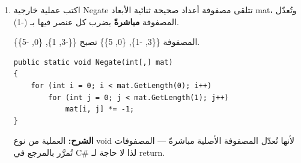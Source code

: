 \documentclass[14pt]{extarticle}
\begin{document}
\begin{enumerate}[itemsep=2em]
\ifwithsols
\begin{boxSolution}
\begin{boxCode}
\begin{english}
\begin{verbatim}
public static int MaxRowIndex(int[,] mat)
{
    int maxSum = int.MinValue;
    int maxIdx = 0;
    for (int i = 0; i < mat.GetLength(0); i++)
    {
        int rowSum = 0;
        for (int j = 0; j < mat.GetLength(1); j++)
            rowSum += mat[i, j];
        if (rowSum > maxSum)
        {
            maxSum = rowSum;
            maxIdx = i;
        }
    }
    return maxIdx;
}
\end{verbatim}
\end{english}
\end{boxCode}
\textbf{الشرح:} في كل دورة \textenglish{i} نحسب مجموع الصف الحالي ونقارنه بأكبر مجموع رأيناه حتى الآن. نحتفظ بـ\textenglish{maxIdx} لأن السؤال يطلب \textbf{رقم الصف} لا المجموع نفسه.
\end{boxSolution}
\clearpage
\fi

\item
اكتب عملية خارجية \textenglish{Negate} تتلقى مصفوفة أعداد صحيحة ثنائية الأبعاد \textenglish{mat}، وتُعدّل المصفوفة \textbf{مباشرةً} بضرب كل عنصر فيها بـ \textenglish{(-1)}.

\begin{boxExample}
المصفوفة \textenglish{\{\{3, -1\}, \{0, 5\}\}} تصبح \textenglish{\{\{-3, 1\}, \{0, -5\}\}}.
\end{boxExample}

\ifwithsols
\begin{boxSolution}
\begin{boxCode}
\begin{english}
\begin{verbatim}
public static void Negate(int[,] mat)
{
    for (int i = 0; i < mat.GetLength(0); i++)
        for (int j = 0; j < mat.GetLength(1); j++)
            mat[i, j] *= -1;
}
\end{verbatim}
\end{english}
\end{boxCode}
\textbf{الشرح:} العملية من نوع \textenglish{void} لأنها تُعدّل المصفوفة الأصلية مباشرةً — المصفوفات تُمرَّر بالمرجع في \textenglish{C\#} لذا لا حاجة لـ \textenglish{return}.
\end{boxSolution}
\fi
\clearpage


\end{enumerate}
\end{document}
